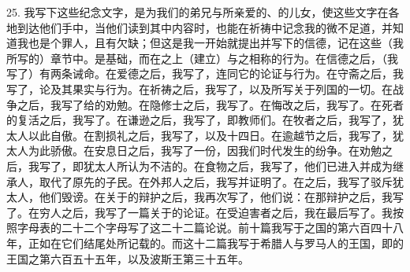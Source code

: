 25. 我写下这些纪念文字，是为我们的弟兄与所亲爱的、的儿女，使这些文字在各地到达他们手中，当他们读到其中内容时，也能在祈祷中记念我的微不足道，并知道我也是个罪人，且有欠缺；但这是我一开始就提出并写下的信德，记在这些（我所写的）章节中。是基础，而在之上（建立）与之相称的行为。在信德之后，（我写了）有两条诫命。在爱德之后，我写了，连同它的论证与行为。在守斋之后，我写了，论及其果实与行为。在祈祷之后，我写了，以及所写关于列国的一切。在战争之后，我写了给的劝勉。在隐修士之后，我写了。在悔改之后，我写了。在死者的复活之后，我写了。在谦逊之后，我写了，即教师们。在牧者之后，我写了，犹太人以此自傲。在割损礼之后，我写了，以及十四日。在逾越节之后，我写了，犹太人为此骄傲。在安息日之后，我写了一份，因我们时代发生的纷争。在劝勉之后，我写了，即犹太人所认为不洁的。在食物之后，我写了，他们已进入并成为继承人，取代了原先的子民。在外邦人之后，我写并证明了。在之后，我写了驳斥犹太人，他们毁谤。在关于的辩护之后，我再次写了，他们说：在那辩护之后，我写了。在穷人之后，我写了一篇关于的论证。在受迫害者之后，我在最后写了。我按照字母表的二十二个字母写了这二十二篇论说。前十篇我写于之国的第六百四十八年，正如在它们结尾处所记载的。而这十二篇我写于希腊人与罗马人的王国，即的王国之第六百五十五年，以及波斯王第三十五年。\par

